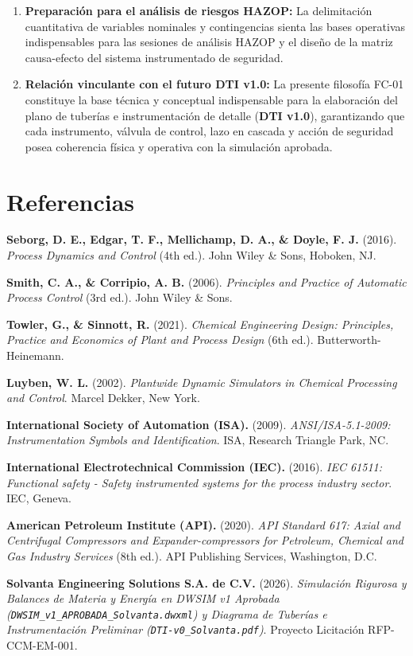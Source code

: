 \documentclass[10pt,letterpaper]{article}
\begin{document}
\begin{enumerate}
    \item \textbf{Preparación para el análisis de riesgos HAZOP:} La delimitación cuantitativa de variables nominales y contingencias sienta las bases operativas indispensables para las sesiones de análisis HAZOP y el diseño de la matriz causa-efecto del sistema instrumentado de seguridad.
    \item \textbf{Relación vinculante con el futuro DTI v1.0:} La presente filosofía FC-01 constituye la base técnica y conceptual indispensable para la elaboración del plano de tuberías e instrumentación de detalle (\textbf{DTI v1.0}), garantizando que cada instrumento, válvula de control, lazo en cascada y acción de seguridad posea coherencia física y operativa con la simulación aprobada.
\end{enumerate}

\section{Referencias}
\small
\begin{enumerate}[label={[\arabic*]}]
    \item \textbf{Seborg, D. E., Edgar, T. F., Mellichamp, D. A., \& Doyle, F. J.} (2016). \textit{Process Dynamics and Control} (4th ed.). John Wiley \& Sons, Hoboken, NJ.
    \item \textbf{Smith, C. A., \& Corripio, A. B.} (2006). \textit{Principles and Practice of Automatic Process Control} (3rd ed.). John Wiley \& Sons.
    \item \textbf{Towler, G., \& Sinnott, R.} (2021). \textit{Chemical Engineering Design: Principles, Practice and Economics of Plant and Process Design} (6th ed.). Butterworth-Heinemann.
    \item \textbf{Luyben, W. L.} (2002). \textit{Plantwide Dynamic Simulators in Chemical Processing and Control}. Marcel Dekker, New York.
    \item \textbf{International Society of Automation (ISA).} (2009). \textit{ANSI/ISA-5.1-2009: Instrumentation Symbols and Identification}. ISA, Research Triangle Park, NC.
    \item \textbf{International Electrotechnical Commission (IEC).} (2016). \textit{IEC 61511: Functional safety - Safety instrumented systems for the process industry sector}. IEC, Geneva.
    \item \textbf{American Petroleum Institute (API).} (2020). \textit{API Standard 617: Axial and Centrifugal Compressors and Expander-compressors for Petroleum, Chemical and Gas Industry Services} (8th ed.). API Publishing Services, Washington, D.C.
    \item \textbf{Solvanta Engineering Solutions S.A. de C.V.} (2026). \textit{Simulación Rigurosa y Balances de Materia y Energía en DWSIM v1 Aprobada (\texttt{DWSIM\_v1\_APROBADA\_Solvanta.dwxml}) y Diagrama de Tuberías e Instrumentación Preliminar (\texttt{DTI-v0\_Solvanta.pdf})}. Proyecto Licitación RFP-CCM-EM-001.
\end{enumerate}
\end{document}
